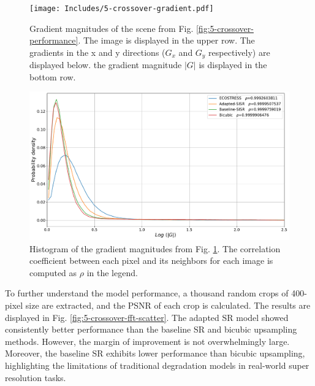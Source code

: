     \begin{figure}[H]
        \centering
        \texttt{[image: Includes/5-crossover-gradient.pdf]}
        \caption{Gradient magnitudes of the scene from Fig. \ref{fig:5-crossover-performance}. The image is displayed in the upper row. The gradients in the x and y directions ($G_x$ and $G_y$ respectively) are displayed below. the gradient magnitude $|G|$ is displayed in the bottom row.}
        \label{fig:5-crossover-gradients}
    \end{figure}

    \begin{figure}[H]
        \centering
        \includegraphics[width=\textwidth]{Includes/5-crossover-gradient-histogram.pdf}
        \caption{Histogram of the gradient magnitudes from Fig. \ref{fig:5-crossover-gradients}. The correlation coefficient between each pixel and its neighbors for each image is computed as $\rho$ in the legend. }
        \label{fig:5-crossover-gradients-histogram}
    \end{figure}
    

    To further understand the model performance, a thousand random crops of 400-pixel size are extracted, and the PSNR of each crop is calculated. The results are displayed in Fig. \ref{fig:5-crossover-fft-scatter}. The adapted SR model showed consistently better performance than the baseline SR and bicubic upsampling methods. However, the margin of improvement is not overwhelmingly large. Moreover, the baseline SR exhibits lower performance than bicubic upsampling,  highlighting the limitations of traditional degradation models in real-world super resolution tasks.


